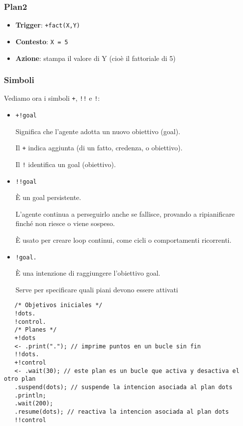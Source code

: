 \subsubsection*{Plan2}

\begin{itemize}
   \item \textbf{Trigger}: \lstinline|+fact(X,Y)|
   \item \textbf{Contesto}: \lstinline|X = 5|
   \item \textbf{Azione}: stampa il valore di Y (cioè il fattoriale di 5)
\end{itemize}

\subsubsection*{Simboli}
Vediamo ora i simboli \lstinline|+|, \lstinline|!!| e \lstinline|!|:
\begin{itemize}
   \item \lstinline|+!goal|
   
   Significa che l'agente adotta un nuovo obiettivo (goal).
   
   Il \lstinline|+| indica aggiunta (di un fatto, credenza, o obiettivo).
   
   Il \lstinline|!| identifica un goal (obiettivo).
   
   \item \lstinline|!!goal|
   
   È un goal persistente.
   
   L'agente continua a perseguirlo anche se fallisce, provando a ripianificare finché non riesce o viene sospeso.
   
   È usato per creare loop continui, come cicli o comportamenti ricorrenti.
   
   \item \lstinline|!goal.|
   
   È una intenzione di raggiungere l'obiettivo goal.
   
   Serve per specificare quali piani devono essere attivati
\end{itemize}
   
   \begin{lstlisting}
   /* Objetivos iniciales */
   !dots.
   !control.
   /* Planes */
   +!dots
   <- .print("."); // imprime puntos en un bucle sin fin
   !!dots.
   +!control
   <- .wait(30); // este plan es un bucle que activa y desactiva el otro plan
   .suspend(dots); // suspende la intencion asociada al plan dots
   .println;
   .wait(200);
   .resume(dots); // reactiva la intencion asociada al plan dots
   !!control
\end{lstlisting}

